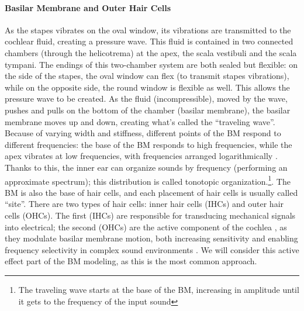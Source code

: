\documentclass[11pt,a4paper]{article}
\begin{document}
\paragraph{Basilar Membrane and Outer Hair Cells}\label{bio-BM}
As the stapes vibrates on the oval window, its vibrations are transmitted to the cochlear fluid, creating a pressure wave. This fluid is contained in two connected chambers (through the helicotrema) at the apex, the scala vestibuli and the scala tympani. The endings of this two-chamber system are both sealed but flexible: on the side of the stapes, the oval window can flex (to transmit stapes vibrations), while on the opposite side, the round window is flexible as well. This allows the pressure wave to be created. As the fluid (incompressible), moved by the wave, pushes and pulls on the bottom of the chamber (basilar membrane), the basilar membrane moves up and down, creating what's called the ``traveling wave''. Because of varying width and stiffness, different points of the BM respond to different frequencies: the base of the BM responds to high frequencies, while the apex vibrates at low frequencies, with frequencies arranged logarithmically \cite{javelAuditorySystemPeripheral2003}. Thanks to this, the inner ear can organize sounds by frequency (performing an approximate spectrum); this distribution is called tonotopic organization.\footnote{The traveling wave starts at the base of the BM, increasing in amplitude until it gets to the frequency of the input sound}. The BM is also the base of hair cells, and each placement of hair cells is usually called ``site''. There are two types of hair cells: inner hair cells (IHCs) and outer hair cells (OHCs). The first (IHCs) are responsible for transducing mechanical signals into electrical; the second (OHCs) are the active component of the cochlea \cite{hopkinsChapter27Deafness2015}, as they modulate basilar membrane motion, both increasing sensitivity and enabling frequency selectivity in complex sound environments \cite{ruggeroFurosemideAltersOrgan1991}. We will consider this active effect part of the BM modeling, as this is the most common approach. 
\end{document}
